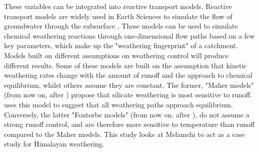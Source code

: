 These variables can be integrated into reactive transport models. Reactive transport models are widely used in Earth Sciences to simulate the flow of groundwater through the subsurface \parencite{bethkeGEOCHEMICALBIOGEOCHEMICALREACTION}. These models can be used to simulate chemical weathering reactions through one-dimensional flow paths based on a few key parameters, which make up the "weathering fingerprint" of a catchment. Models built on different assumptions on weathering control will produce different results. Some of these models are built on the assumption that kinetic weathering rates change with the amount of runoff and the approach to chemical equilibrium, whilst others assume they are constant. The former, "Maher models" (from now on, after \textcite{maherRoleFluidResidence2011}) propose that silicate weathering is most sensitive to runoff. \textcite{maherRoleFluidResidence2011} uses this model to suggest that all weathering paths approach equilibrium. Conversely, the latter "Fontorbe models" (from now on, after \textcite{fontorbeSiliconIsotopicComposition2013}), do not assume a strong runoff control, and are therefore more sensitive to temperature than runoff compared to the Maher models. This study looks at Melamchi to act as a case study for Himalayan weathering.
\bsk

